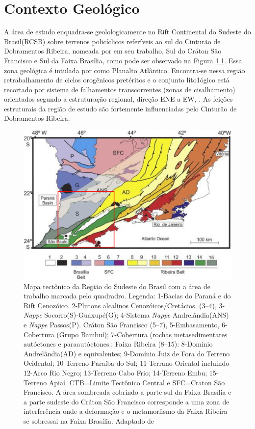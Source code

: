 \chapter{Contexto Geológico}

A área de estudo enquadra-se geolologicamente no Rift Continental do Sudeste do Brasil(RCSB) sobre terrenos policíclicos referíveis ao sul do Cinturão de Dobramentos Ribeira, nomeada por \cite{Riccomini_1989} em seu trabalho, Sul do Cráton São Francisco e Sul da Faixa Brasília, como pode ser observado na Figura \ref{mapa_geologico}. Essa zona geológica é intulada por \cite{Almeida_Carneiro_1998} como Planalto Atlântico. Encontra-se nessa região retrabalhamento de ciclos orogênicos pretéritos e o conjunto lito1ógico está recortado por sistema de falhamentos transcorrentes (zonas de cisalhamento) orientados segundo a estruturação regional, direção ENE a EW, \cite{Hasui_Sadowski_1976}. As feições estruturais da região de estudo são fortemente influenciadas pelo Cinturão de Dobramentos Ribeira.

\begin{figure}[!ht]
\centering
\includegraphics[scale=0.9]{Figs/mapa_geologico.png}
\caption[Mapa tectônico da Região do Sudeste do Brasil.]{Mapa tectônico da Região do Sudeste do Brasil com a área de trabalho marcada pelo quadradro. Legenda: 1-Bacias do Paraná e do Rift Cenozóico. 2-Plutons alcalinos Cenozóicos/Cretácios. (3–4), 3-\textit{Nappe} Socorro(S)-Guaxupé(G); 4-Sistema \textit{Nappe} Andrelândia(ANS) e \textit{Nappe} Passos(P). Cráton São Francisco (5–7), 5-Embasamento, 6-Cobertura (Grupo Bambuí); 7-Cobertura (rochas metasedimentares autóctones e paraautóctones.;  Faixa Ribeira (8–15): 8-Domínio Andrelândia(AD) e equivalentes; 9-Domínio Juiz de Fora do Terreno Ocidental; 10-Terreno Paraíba do Sul; 11-Terrano Oriental incluindo  12-Arco Rio Negro; 13-Terreno Cabo Frio; 14-Terreno Embu; 15-Terreno Apiaí. CTB=Limite Tectônico Central e SFC=Craton São Francisco. A área sombreada cobrindo a parte sul da Faixa Brasília e a parte sudeste do Cráton São Francisco corresponde a uma zona de interferência onde a deformação e o metamorfismo da Faixa Ribeira se  sobressai na Faixa Brasília. Adaptado de \cite{trouw_new_2013}}
\label{mapa_geologico}
\end{figure} 

